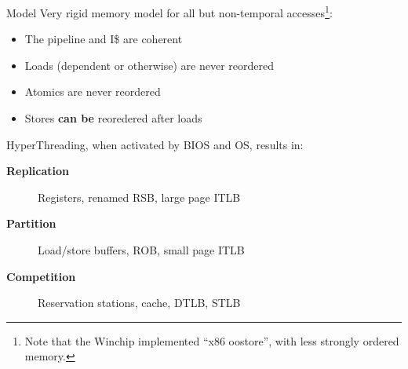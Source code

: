 \documentclass[mathserif,xcolor={dvipsnames,table}]{beamer}
\begin{document}
\begin{frame}{Model}
Very rigid memory model for all but non-temporal accesses\footnote{Note that the Winchip implemented ``x86 oostore'', with less strongly ordered memory.}:
\begin{itemize}
\item The pipeline and I\$ are coherent
\item Loads (dependent or otherwise) are never reordered
\item Atomics are never reordered
\item Stores \textbf{can be} reoredered after loads
\end{itemize}
HyperThreading, when activated by BIOS and OS, results in:
\begin{description}
\item[\textbf{Replication}] Registers, renamed RSB, large page ITLB
\item[\textbf{Partition}] Load/store buffers, ROB, small page ITLB
\item[\textbf{Competition}] Reservation stations, cache, DTLB, STLB 
\end{description}
\end{frame}
\end{document}

